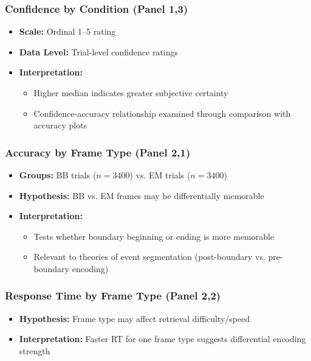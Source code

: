 \documentclass[12pt,a4paper]{article}
\begin{document}
\subsubsection{Confidence by Condition (Panel 1,3)}
\begin{itemize}
    \item \textbf{Scale:} Ordinal 1--5 rating
    \item \textbf{Data Level:} Trial-level confidence ratings
    \item \textbf{Interpretation:}
        \begin{itemize}
            \item Higher median indicates greater subjective certainty
            \item Confidence-accuracy relationship examined through comparison with accuracy plots
        \end{itemize}
\end{itemize}

\subsubsection{Accuracy by Frame Type (Panel 2,1)}
\begin{itemize}
    \item \textbf{Groups:} BB trials ($n=3400$) vs. EM trials ($n=3400$)
    \item \textbf{Hypothesis:} BB vs. EM frames may be differentially memorable
    \item \textbf{Interpretation:}
        \begin{itemize}
            \item Tests whether boundary beginning or ending is more memorable
            \item Relevant to theories of event segmentation (post-boundary vs. pre-boundary encoding)
        \end{itemize}
\end{itemize}

\subsubsection{Response Time by Frame Type (Panel 2,2)}
\begin{itemize}
    \item \textbf{Hypothesis:} Frame type may affect retrieval difficulty/speed
    \item \textbf{Interpretation:} Faster RT for one frame type suggests differential encoding strength
\end{itemize}
\end{document}
